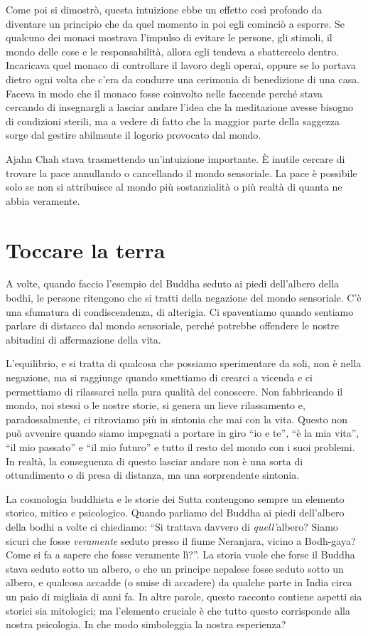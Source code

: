 Come poi si dimostrò, questa intuizione ebbe un effetto così profondo da diventare un principio che da quel momento in poi egli cominciò a esporre. Se qualcuno dei monaci mostrava l'impulso di evitare le persone, gli stimoli, il mondo delle cose e le responsabilità, allora egli tendeva a sbattercelo dentro. Incaricava quel monaco di controllare il lavoro degli operai, oppure se lo portava dietro ogni volta che c'era da condurre una cerimonia di benedizione di una casa. Faceva in modo che il monaco fosse coinvolto nelle faccende perché stava cercando di insegnargli a lasciar andare l'idea che la meditazione avesse bisogno di condizioni sterili, ma a vedere di fatto che la maggior parte della saggezza sorge dal gestire abilmente il logorio provocato dal mondo.

Ajahn Chah stava trasmettendo un'intuizione importante. È inutile cercare di trovare la pace annullando o cancellando il mondo sensoriale. La pace è possibile solo se non si attribuisce al mondo più sostanzialità o più realtà di quanta ne abbia veramente.

\section*{Toccare la terra}

A volte, quando faccio l'esempio del Buddha seduto ai piedi dell'albero della bodhi, le persone ritengono che si tratti della negazione del mondo sensoriale. C'è una sfumatura di condiscendenza, di alterigia. Ci spaventiamo quando sentiamo parlare di distacco dal mondo sensoriale, perché potrebbe offendere le nostre abitudini di affermazione della vita. 

L'equilibrio, e si tratta di qualcosa che possiamo sperimentare da soli, non è nella negazione, ma si raggiunge quando smettiamo di crearci a vicenda e ci permettiamo di rilassarci nella pura qualità del conoscere. Non fabbricando il mondo, noi stessi o le nostre storie, si genera un lieve rilassamento e, paradossalmente, ci ritroviamo più in sintonia che mai con la vita. Questo non può avvenire quando siamo impegnati a portare in giro ``io e te'', ``è la mia vita'', ``il mio passato'' e ``il mio futuro'' e tutto il resto del mondo con i suoi problemi. In realtà, la conseguenza di questo lasciar andare non è una sorta di ottundimento o di presa di distanza, ma una sorprendente sintonia.

La cosmologia buddhista e le storie dei Sutta contengono sempre un elemento storico, mitico e psicologico. Quando parliamo del Buddha ai piedi dell'albero della bodhi a volte ci chiediamo: ``Si trattava davvero di \textit{quell'}albero? Siamo sicuri che fosse \textit{veramente }seduto presso il fiume Neranjara, vicino a Bodh-gaya? Come si fa a sapere che fosse veramente lì?''. La storia vuole che forse il Buddha stava seduto sotto un albero, o che un principe nepalese fosse seduto sotto un albero, e qualcosa accadde (o smise di accadere) da qualche parte in India circa un paio di migliaia di anni fa. In altre parole, questo racconto contiene aspetti sia storici sia mitologici; ma l'elemento cruciale è che tutto questo corrisponde alla nostra psicologia. In che modo simboleggia la nostra esperienza?

